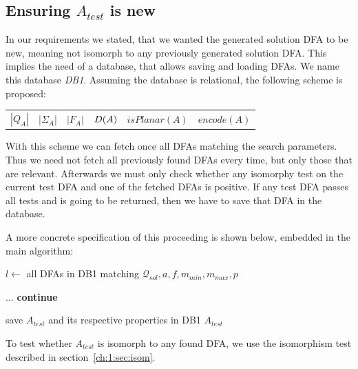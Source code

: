 \subsection{Ensuring $A_{test}$ is new}

In our requirements we stated, that we wanted the generated solution DFA to be new, meaning not isomorph to any previously generated solution DFA. This implies the need of a database, that allows saving and loading DFAs. We name this database \emph{DB1}. Assuming the database is relational, the following scheme is proposed:
\begin{center}
	\begin{tabular}{c c c c c c}
	$|Q_A|$ & |$\Sigma_A$| & $|F_A|$ & $D(A)$ & $isPlanar(A)$ & $encode(A)$
	\end{tabular}
\end{center}
With this scheme we can fetch once all DFAs matching the search parameters. Thus we need not fetch all previously found DFAs every time, but only those that are relevant. Afterwards we must only check whether any isomorphy test on the current test DFA and one of the fetched DFAs is positive. If any test DFA passes all tests and is going to be returned, then we have to save that DFA in the database.

A more concrete specification of this proceeding is shown below, embedded in the main algorithm:
\vspace{0.2cm}
\begin{algorithmic}[1]
	
		\vspace{0.2cm}
	
		\State $l \gets$ all DFAs in DB1 matching $\mathcal{Q}_{sol}, a, f, m_{min}, m_{max}, p$
		
		\vspace{0.2cm}
		
		
		\vspace{0.2cm}
		
			\State $\ldots$
				\State \textbf{continue}
			\EndIf
			
			\vspace{0.2cm}
			
			\State save $A_{test}$ and its respective properties in DB1
			\State\Return $A_{test}$
		\EndWhile
	\EndFunction
\end{algorithmic}
\vspace{0.2cm}
To test whether $A_{test}$ is isomorph to any found DFA, we use the isomorphism test described in section~\ref{ch:1:sec:isom}.

